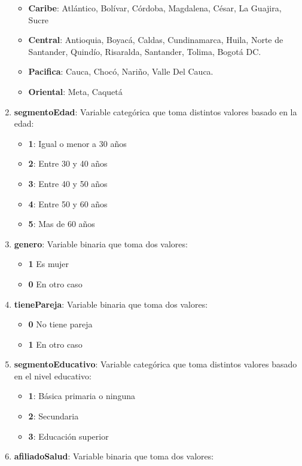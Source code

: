 \documentclass[12pt,a4paper]{article}
\begin{document}
\begin{enumerate}
		\begin{itemize}
			\item \textbf{Caribe}: Atlántico, Bolívar, Córdoba, Magdalena, César, La Guajira, Sucre
			\item \textbf{Central}: Antioquia, Boyacá, Caldas, Cundinamarca, Huila, Norte de Santander, Quindío, Risaralda, Santander, Tolima, Bogotá DC.
			\item \textbf{Pacifica}: Cauca, Chocó, Nariño,	Valle Del Cauca.
			\item \textbf{Oriental}: Meta, Caquetá
		\end{itemize}
		\item \textbf{segmentoEdad}: Variable  categórica que toma distintos valores basado en la edad:
		\begin{itemize}
			\item \textbf{1}: Igual o menor a 30 años
			\item \textbf{2}: Entre 30 y 40 años
			\item \textbf{3}: Entre 40 y 50 años
			\item \textbf{4}: Entre 50 y 60 años
			\item \textbf{5}: Mas de 60 años
		\end{itemize}
		\item \textbf{genero}: Variable binaria que toma dos valores:
		\begin{itemize}
			\item \textbf{1} Es mujer
			\item \textbf{0} En otro caso
		\end{itemize}
		\item \textbf{tienePareja}: Variable binaria que toma dos valores:
		\begin{itemize}
			\item \textbf{0} No tiene pareja
			\item \textbf{1} En otro caso
		\end{itemize}
		\item \textbf{segmentoEducativo}: Variable  categórica que toma distintos valores basado en el nivel educativo:
		\begin{itemize}
			\item \textbf{1}: Básica primaria o ninguna
			\item \textbf{2}: Secundaria
			\item \textbf{3}: Educación superior
		\end{itemize}
		\item \textbf{afiliadoSalud}: Variable binaria que toma dos valores:

\end{enumerate}
\end{document}
